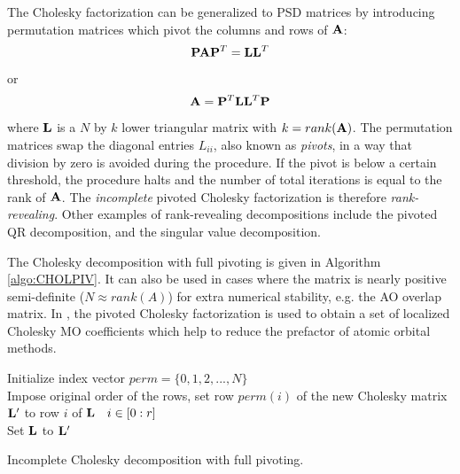 The Cholesky factorization can be generalized to PSD matrices by introducing permutation matrices which pivot the columns and rows of $\mathbf{A}$:
\begin{equation}
\mathbf{P} \mathbf{A} \mathbf{P}^T = \mathbf{L} \mathbf{L}^T 
\end{equation}
\noindent or
\begin{equation}
\mathbf{A} = \mathbf{P}^T \mathbf{L} \mathbf{L}^T \mathbf{P}
\end{equation}
\noindent where $\mathbf{L}$ is a $N$ by $k$ lower triangular matrix with $k = rank(\mathbf{A})$. The 
permutation matrices swap the diagonal entries $L_{ii}$, also known as \emph{pivots}, in a way that division by zero is avoided during the procedure. If the pivot is below a certain threshold, the procedure halts and the number of total iterations is equal to the rank of $\mathbf{A}$. The \emph{incomplete} pivoted Cholesky factorization is therefore \emph{rank-revealing}. Other examples of rank-revealing decompositions include the pivoted QR decomposition, and the singular value decomposition.

The Cholesky decomposition with full pivoting is given in Algorithm \ref{algo:CHOLPIV}. It can also be used in cases where the matrix is nearly positive semi-definite ($N \approx rank(A)$) for extra numerical stability, e.g. the AO overlap matrix. In \mchem{}, the pivoted Cholesky factorization is used to obtain a set of localized Cholesky MO coefficients which help to reduce the prefactor of atomic orbital methods. 

\begin{algorithm}
Initialize index vector $perm = \{0,1,2,...,N\}$
\\
Impose original order of the rows, set row $perm(i)$ of the new Cholesky matrix $\mathbf{L}'$ to row $i$ of $\mathbf{L} \quad i \in [0:r]$
\\
Set $\mathbf{L}$ to $\mathbf{L}'$

\caption{Incomplete Cholesky decomposition with full pivoting.}
\label{algo:CHOLPIV}
\end{algorithm}

